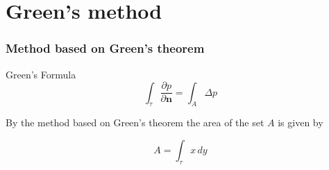 \documentclass{beamer}
\begin{document}
\section{Green's method}


\begin{frame}
\frametitle{Method based on Green's theorem}

\begin{block}{Green's Formula}
\begin{equation}
\int_\tau \frac{\partial p}{\partial \mathbf n} = \int_{A} \Delta p
\end{equation}
\end{block}
%
By the method based on Green's theorem the area of the set $A$ is given by
%
\begin{block}{}
\begin{equation}
A = \int_\tau x\,dy
 \label{eq:green}
\end{equation}
\end{block}

\end{frame}

%
\end{document}
